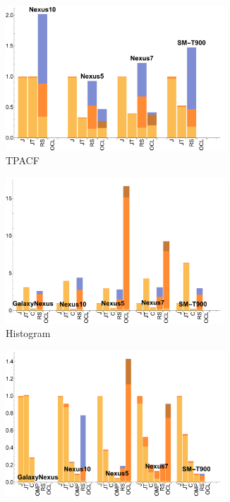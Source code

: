 \begin{figure}
  \begin{subfigure}[b]{0.33\textwidth}
      \centering
      \includegraphics[width=0.9\textwidth]{data/Tpacf_onecompute_time.pdf}
      \caption{TPACF}
  \end{subfigure}
  \begin{subfigure}[b]{0.33\textwidth}
      \centering
      \includegraphics[width=0.9\textwidth]{data/Histogram_onecompute_time.pdf}
      \caption{Histogram}
  \end{subfigure}
  \begin{subfigure}[b]{0.33\textwidth}
      \centering
      \includegraphics[width=0.9\textwidth]{data/Stencil_onecompute_time.pdf}

\end{subfigure}
\end{figure}
